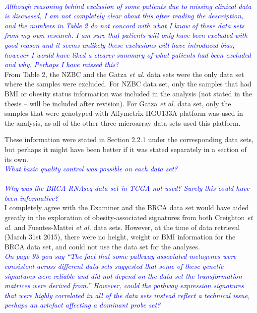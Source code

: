\documentclass[a4paper, 12pt]{article}
\begin{document}
\noindent
\\

\noindent
\textcolor{blue}{
	\textit{Although reasoning behind exclusion of some patients due to missing clinical data is discussed, I am not completely clear about this after reading the description, and the numbers in Table 2 do not concord with what I know of these data sets from my own research.
	I am sure that patients will only have been excluded with good reason and it seems unlikely these exclusions will have introduced bias, however I would have liked a clearer summary of what patients had been excluded and why.
	Perhaps I have missed this?
	}
}\\

\noindent
From Table 2, the NZBC and the Gatza \textit{et al.} data sets were the only data set where the samples were excluded.
For NZBC data set, only the samples that had BMI or obesity status  information was included in the analysis (not stated in the thesis --  will be included after revision).
For Gatza \textit{et al.} data set, only the samples that were genotyped with Affymetrix HGU133A platform was used in the analysis, as all of the other three microarray data sets used this platform.

These information were stated in Section 2.2.1 under the corresponding data sets, but perhaps it might have been better if it was stated separately in a section of its own.
\\

\noindent
\textcolor{blue}{
	\textit{What basic quality control was possible on each data set?
	}
}\\

\noindent
\\

\noindent
\textcolor{blue}{
	\textit{Why was the BRCA RNAseq data set in TCGA not used?
	Surely this could have been informative?
	}
}\\

\noindent
I completely agree with the Examiner and the BRCA data set would have aided greatly in the exploration of obesity-associated signatures from both Creighton \textit{et al.} and Fuentes-Mattei \textit{et al.} data sets.
However, at the time of data retrieval (March 31st 2015), there were no height, weight or BMI information for the BRCA data set, and could not use the data set for the analyses.
\\

\noindent
\textcolor{blue}{
	\textit{On page 93 you say ``The fact that some pathway associated metagenes were consistent across different data sets suggested that some of these genetic signatures were reliable and did not depend on the data set the transformation matrices were derived from.''
	However, could the pathway expression signatures that were highly correlated in all of the  data sets instead reflect a technical issue, perhaps an artefact affecting a dominant probe set?
	}
}\\
\end{document}
